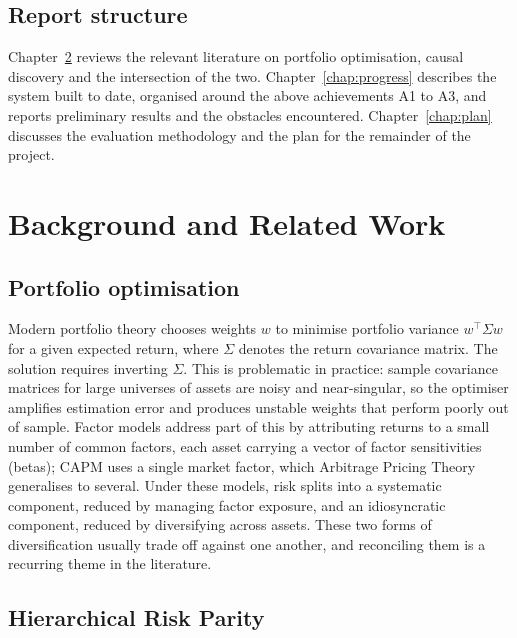 \documentclass[12pt, a4paper]{report}
\begin{document}
\section{Report structure}

Chapter~\ref{chap:background} reviews the relevant literature on portfolio optimisation, causal
discovery and the intersection of the two. Chapter~\ref{chap:progress} describes
the system built to date, organised around the above achievements A1 to A3, and reports preliminary results
and the obstacles encountered. Chapter~\ref{chap:plan} discusses the evaluation methodology and the
plan for the remainder of the project.

\chapter{Background and Related Work}
\label{chap:background}

\section{Portfolio optimisation}

Modern portfolio theory \cite{markowitz1952portfolio} chooses weights $w$ to minimise portfolio
variance $w^\top \Sigma w$ for a given expected return, where $\Sigma$ denotes the return covariance
matrix. The solution requires inverting $\Sigma$. This is problematic in practice: sample
covariance matrices for large universes of assets are noisy and near-singular, so the optimiser amplifies
estimation error and produces unstable weights that perform poorly out of sample.
Factor models address part of this by attributing returns to a small number of common factors,
each asset carrying a vector of factor sensitivities (betas); CAPM \cite{sharpe1964capm} uses a
single market factor, which Arbitrage Pricing Theory \cite{ross1976apt} generalises to several. 
Under these models, risk splits into a
systematic component, reduced by managing factor exposure, and an idiosyncratic component, reduced
by diversifying across assets.
These two forms of diversification usually trade off against one
another, and reconciling them is a recurring theme in the literature.

\section{Hierarchical Risk Parity}
\label{sec:hrp}
\end{document}
